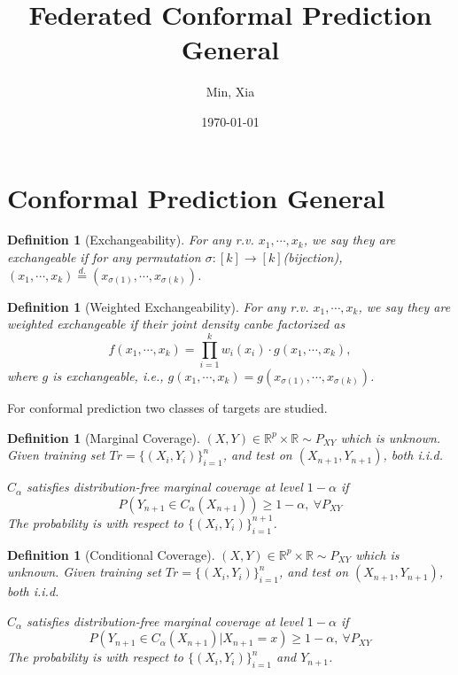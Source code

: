 \documentclass[12pt, a4paper, oneside]{article}
\title{\textbf{Federated Conformal Prediction General}}
\author{Min, Xia}
\date{\today}
\newtheorem{definition}[theorem]{Definition}
\begin{document}
\maketitle
\setcounter{page}{1}
\section[Section title sans citation]{Conformal Prediction General\cite{angelopoulos2023conformal}}
    \begin{definition}[Exchangeability]\cite{shafer2008tutorial}
        For any r.v. $x_1,\cdots,x_k$, we say they are exchangeable if for any permutation $\sigma:[k]\rightarrow[k]$(bijection), $(x_1,\cdots,x_k)\overset{d.}{=}(x_{\sigma(1)},\cdots,x_{\sigma(k)})$.
    \end{definition}


    \begin{definition}[Weighted Exchangeability]\cite{tibshirani2019conformal}
        For any r.v. $x_1,\cdots,x_k$, we say they are weighted exchangeable if their joint density canbe factorized as
        \begin{equation*}
            f(x_1,\cdots,x_k)=\overset{k}{\underset{i=1}{\prod}}w_i(x_i)\cdot g(x_1,\cdots,x_k),
        \end{equation*}
        where $g$ is exchangeable, i.e., $g(x_1,\cdots,x_k)=g(x_{\sigma(1)},\cdots,x_{\sigma(k)})$.
    \end{definition}


    For conformal prediction two classes of targets are studied.
    \begin{definition}[Marginal Coverage]
        $(X,Y)\in\mathbb{R}^p\times\mathbb{R}\sim P_{XY}$ which is unknown. Given training set $Tr=\{(X_i,Y_i)\}_{i=1}^n$, and test on $(X_{n+1},Y_{n+1})$, both i.i.d.


        $C_\alpha$  satisfies distribution-free marginal coverage at level $1-\alpha$ if
        \begin{equation*}
            P(Y_{n+1}\in C_\alpha(X_{n+1}))\geq 1-\alpha,\ \forall P_{XY}
        \end{equation*}
        The probability is with respect to $\{(X_i,Y_i)\}_{i=1}^{n+1}$.
    \end{definition}


    \begin{definition}[Conditional Coverage]
        $(X,Y)\in\mathbb{R}^p\times\mathbb{R}\sim P_{XY}$ which is unknown. Given training set $Tr=\{(X_i,Y_i)\}_{i=1}^n$, and test on $(X_{n+1},Y_{n+1})$, both i.i.d.


        $C_\alpha$  satisfies distribution-free marginal coverage at level $1-\alpha$ if
        \begin{equation*}
            P\left( Y_{n+1}\in C_\alpha(X_{n+1})\Big|X_{n+1}=x \right)\geq 1-\alpha,\ \forall P_{XY}
        \end{equation*}
        The probability is with respect to $\{(X_i,Y_i)\}_{i=1}^n$ and $Y_{n+1}$.
    \end{definition}
\end{document}
